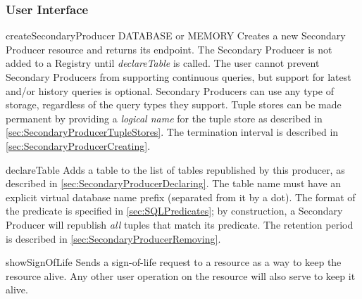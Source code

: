 \subsubsection{User Interface}

\begin{method}{createSecondaryProducer}
 {DATABASE or MEMORY}
\desc Creates a new Secondary Producer resource and returns its endpoint. The
Secondary Producer is not added to a Registry until \textit{declareTable} is
called. The user cannot prevent Secondary Producers from supporting
continuous queries, but support for latest and/or history queries is optional.
Secondary Producers can use any type of storage, regardless of the query types
they support. Tuple stores can be made permanent by providing a
\textit{logical name} for the tuple store as described in
\ref{sec:SecondaryProducerTupleStores}.
The termination interval is described in \ref{sec:SecondaryProducerCreating}.
\end{method}

\begin{method}{declareTable}
\OK
\desc
Adds a table to the list of tables republished by this producer, as described
in \ref{sec:SecondaryProducerDeclaring}. The table name must have an explicit
virtual database name prefix (separated from it by a dot).
The format of the
predicate is specified in \ref{sec:SQLPredicates}; by construction, a Secondary
Producer will republish \textit{all} tuples that match its predicate. The
retention period is described in \ref{sec:SecondaryProducerRemoving}.\\
\end{method}\par

\begin{method}{showSignOfLife}
\OK
\desc Sends a sign-of-life request to a resource as a way to keep
the resource alive. Any other user operation on the resource will also serve
to keep it alive.
\end{method}

